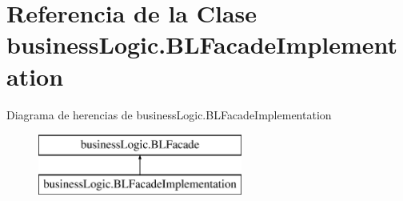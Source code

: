 \hypertarget{classbusinessLogic_1_1BLFacadeImplementation}{}\section{Referencia de la Clase business\+Logic.\+B\+L\+Facade\+Implementation}
\label{classbusinessLogic_1_1BLFacadeImplementation}
Diagrama de herencias de business\+Logic.\+B\+L\+Facade\+Implementation\begin{figure}[H]
\begin{center}
\leavevmode
\includegraphics[height=2.000000cm]{classbusinessLogic_1_1BLFacadeImplementation}
\end{center}
\end{figure}
